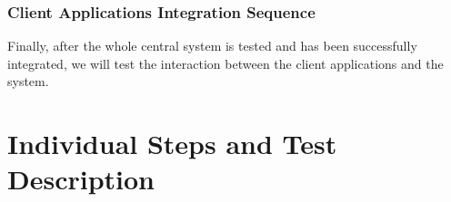 \documentclass[english]{article}
\begin{document}
\begin{figure}[H]
	\centering
\end{figure}


\subsubsection{Client Applications Integration Sequence}
Finally, after the whole central system is tested and has been successfully integrated, we will test the interaction between the client applications and the system.

\begin{figure}[H]
	\centering
\end{figure}



\section{Individual Steps and Test Description}

\end{document}
